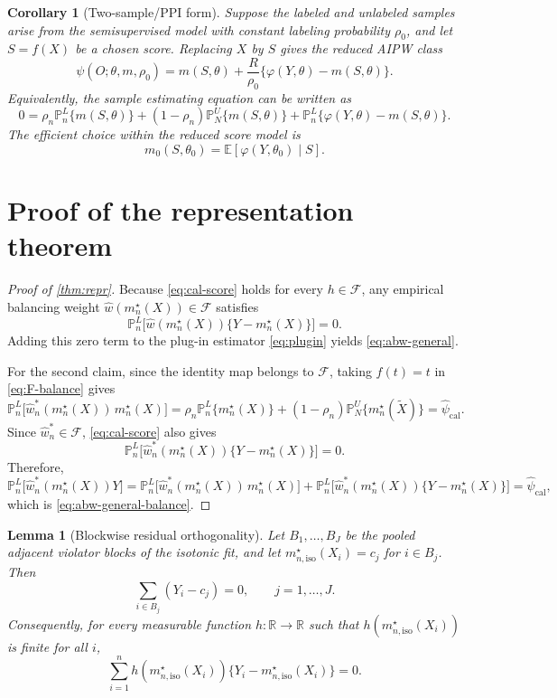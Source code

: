 \documentclass{article}
\theoremstyle{plain}
\newtheorem{lemma}{Lemma}
\newtheorem{corollary}{Corollary}
\theoremstyle{definition}
\newcommand{\E}{\mathbb{E}}
\newcommand{\R}{\mathbb{R}}
\newcommand{\1}{\mathbbm{1}}
\newcommand{\psihat}{\widehat{\psi}_{\mathrm{cal}}}
\newcommand{\what}{\widehat w}
\newcommand{\rhon}{\rho_n}
\newcommand{\mtilde}{m_n^\star}
\newcommand{\Pl}{\mathbb{P}^{L}_n}
\newcommand{\Pu}{\mathbb{P}^{U}_N}
\begin{document}
\begin{corollary}[Two-sample/PPI form]
Suppose the labeled and unlabeled samples arise from the semisupervised model with constant labeling probability \(\rho_0\), and let \(S=f(X)\) be a chosen score. Replacing \(X\) by \(S\) gives the reduced AIPW class
\[
\psi(O;\theta,m,\rho_0)
=
m(S,\theta)+\frac{R}{\rho_0}\{\varphi(Y,\theta)-m(S,\theta)\}.
\]
Equivalently, the sample estimating equation can be written as
\[
0=
\rho_n \mathbb P_n^L\{m(S,\theta)\}
+
(1-\rho_n)\mathbb P_N^U\{m(S,\theta)\}
+
\mathbb P_n^L\{\varphi(Y,\theta)-m(S,\theta)\}.
\]
The efficient choice within the reduced score model is
\[
m_0(S,\theta_0)=\E[\varphi(Y,\theta_0)\mid S].
\]
\end{corollary}





\section{Proof of the representation theorem}
\label{app:repr}

\begin{proof}[Proof of \cref{thm:repr}]
Because \cref{eq:cal-score} holds for every \(h\in\mathcal F\), any empirical balancing weight \(\what(\mtilde(X))\in\mathcal F\) satisfies
\[
\Pl\bigl[\what(\mtilde(X))\{Y-\mtilde(X)\}\bigr]=0.
\]
Adding this zero term to the plug-in estimator \cref{eq:plugin} yields \cref{eq:abw-general}.

For the second claim, since the identity map belongs to \(\mathcal F\), taking \(f(t)=t\) in \cref{eq:F-balance} gives
\[
\Pl\bigl[\what_n^*(\mtilde(X))\,\mtilde(X)\bigr]
=
\rhon \Pl\{\mtilde(X)\}
+
(1-\rhon)\Pu\{\mtilde(\widetilde X)\}
=
\psihat.
\]
Since \(\what_n^*\in\mathcal F\), \cref{eq:cal-score} also gives
\[
\Pl\bigl[\what_n^*(\mtilde(X))\{Y-\mtilde(X)\}\bigr]=0.
\]
Therefore,
\[
\Pl\bigl[\what_n^*(\mtilde(X))Y\bigr]
=
\Pl\bigl[\what_n^*(\mtilde(X))\,\mtilde(X)\bigr]
+
\Pl\bigl[\what_n^*(\mtilde(X))\{Y-\mtilde(X)\}\bigr]
=
\psihat,
\]
which is \cref{eq:abw-general-balance}.
\end{proof}


\begin{lemma}[Blockwise residual orthogonality]
\label{lem:block}
Let \(B_1,\dots,B_J\) be the pooled adjacent violator blocks of the isotonic fit, and let \(m_{n,\mathrm{iso}}^\star(X_i)=c_j\) for \(i \in B_j\). Then
\[
\sum_{i \in B_j}(Y_i-c_j)=0,
\qquad j=1,\dots,J.
\]
Consequently, for every measurable function \(h:\R \to \R\) such that \(h(m_{n,\mathrm{iso}}^\star(X_i))\) is finite for all \(i\),
\[
\sum_{i=1}^n h(m_{n,\mathrm{iso}}^\star(X_i))\{Y_i-m_{n,\mathrm{iso}}^\star(X_i)\}=0.
\]
\end{lemma}
\end{document}
